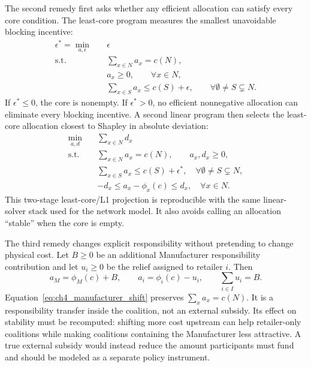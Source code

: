 The second remedy first asks whether any efficient allocation can satisfy every core condition. The least-core program \cite{MaschlerPelegShapley1979} measures the smallest unavoidable blocking incentive:
\begin{equation}
\label{eq:ch4_least_core}
\begin{aligned}
\epsilon^*=\min_{a,\epsilon}\quad & \epsilon\\
\text{s.t.}\quad
& \sum_{x\in N}a_x=c(N),\\
& a_x\geq 0, \qquad \forall x\in N,\\
& \sum_{x\in S}a_x\leq c(S)+\epsilon,
\qquad \forall \emptyset\neq S\subsetneq N.
\end{aligned}
\end{equation}
If $\epsilon^*\leq0$, the core is nonempty. If $\epsilon^*>0$, no efficient nonnegative allocation can eliminate every blocking incentive. A second linear program then selects the least-core allocation closest to Shapley in absolute deviation:
\begin{equation}
\label{eq:ch4_constrained_projection}
\begin{aligned}
\min_{a,d}\quad & \sum_{x\in N}d_x\\
\text{s.t.}\quad
& \sum_{x\in N}a_x=c(N), \qquad a_x,d_x\geq0,\\
& \sum_{x\in S}a_x\leq c(S)+\epsilon^*,
\quad \forall \emptyset\neq S\subsetneq N,\\
& -d_x\leq a_x-\phi_x(c)\leq d_x,
\quad \forall x\in N.
\end{aligned}
\end{equation}
This two-stage least-core/L1 projection is reproducible with the same linear-solver stack used for the network model. It also avoids calling an allocation ``stable'' when the core is empty.

The third remedy changes explicit responsibility without pretending to change physical cost. Let $B\geq0$ be an additional Manufacturer responsibility contribution and let $u_i\geq0$ be the relief assigned to retailer $i$. Then
\begin{equation}
\label{eq:ch4_manufacturer_shift}
a_M=\phi_M(c)+B,
\qquad
a_i=\phi_i(c)-u_i,
\qquad
\sum_{i\in I}u_i=B.
\end{equation}
Equation~\eqref{eq:ch4_manufacturer_shift} preserves $\sum_xa_x=c(N)$. It is a responsibility transfer inside the coalition, not an external subsidy. Its effect on stability must be recomputed: shifting more cost upstream can help retailer-only coalitions while making coalitions containing the Manufacturer less attractive. A true external subsidy would instead reduce the amount participants must fund and should be modeled as a separate policy instrument.

